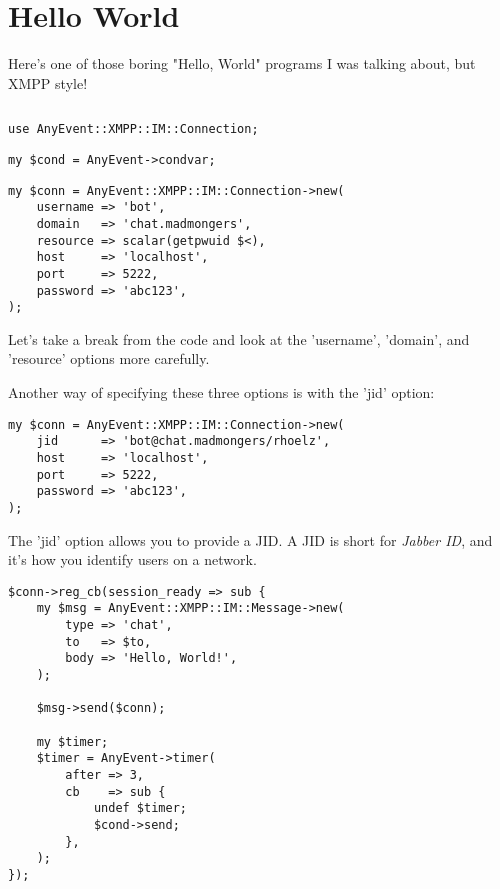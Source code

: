 \section{Hello World}

Here's one of those boring "Hello, World" programs I was talking about, but XMPP style!

\begin{shaded}
\inputminted{perl}{examples/hello.pl}
\end{shaded}
\pause

\begin{shaded}
\begin{verbatim}
use AnyEvent::XMPP::IM::Connection;
\end{verbatim}
\end{shaded}

\pause
\begin{shaded}
\begin{verbatim}
my $cond = AnyEvent->condvar;
\end{verbatim}
\end{shaded}

\newpage
\begin{shaded}
\begin{verbatim}
my $conn = AnyEvent::XMPP::IM::Connection->new(
    username => 'bot',
    domain   => 'chat.madmongers',
    resource => scalar(getpwuid $<),
    host     => 'localhost',
    port     => 5222,
    password => 'abc123',
);
\end{verbatim}
\end{shaded}

\pause
Let's take a break from the code and look at the 'username', 'domain', and
'resource' options more carefully.

\pause
Another way of specifying these three options is with the 'jid' option:

\begin{shaded}
\begin{verbatim}
my $conn = AnyEvent::XMPP::IM::Connection->new(
    jid      => 'bot@chat.madmongers/rhoelz',
    host     => 'localhost',
    port     => 5222,
    password => 'abc123',
);
\end{verbatim}
\end{shaded}

\pause
The 'jid' option allows you to provide a JID.  A JID is short for \textit{Jabber ID}, and it's how
you identify users on a network.

\pause
\begin{shaded}
\begin{verbatim}
$conn->reg_cb(session_ready => sub {
    my $msg = AnyEvent::XMPP::IM::Message->new(
        type => 'chat',
        to   => $to,
        body => 'Hello, World!',
    );

    $msg->send($conn);

    my $timer;
    $timer = AnyEvent->timer(
        after => 3,
        cb    => sub {
            undef $timer;
            $cond->send;
        },
    );
});
\end{verbatim}
\end{shaded}

